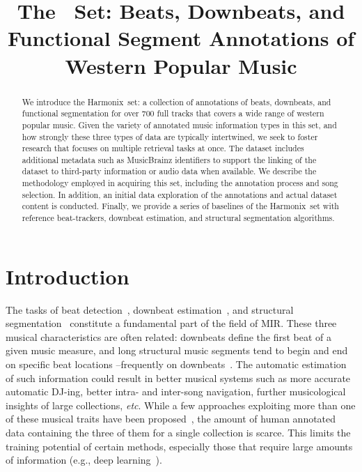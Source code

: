\documentclass{article}
\title{The \setNameUpper~Set: Beats, Downbeats, and Functional Segment Annotations of Western Popular Music}
\newcommand{\setName}{Harmonix}
\begin{document}
%
\maketitle
%
\begin{abstract}
    We introduce the \setName~set: a collection of annotations of beats, downbeats, and functional segmentation for over 700 full tracks that covers a wide range of western popular music.
    Given the variety of annotated music information types in this set, and how strongly these three types of data are typically intertwined, we seek to foster research that focuses on multiple retrieval tasks at once.
    The dataset includes additional metadata such as MusicBrainz identifiers to support the linking of the dataset to third-party information or audio data when available.
    We describe the methodology employed in acquiring this set, including the annotation process and song selection. 
    In addition, an initial data exploration of the annotations and actual dataset content is conducted. 
    Finally, we provide a series of baselines of the \setName~set with reference beat-trackers, downbeat estimation, and structural segmentation algorithms.
\end{abstract}
%
\section{Introduction}\label{sec:introduction}

The tasks of beat detection~\cite{Ellis2007}, downbeat estimation~\cite{Bock2016}, and structural segmentation~\cite{Paulus2010} constitute a fundamental part of the field of MIR.
These three musical characteristics are often related: downbeats define the first beat of a given music measure, and long structural music segments tend to begin and end on specific beat locations --frequently on downbeats~\cite{Foote1999}.
The automatic estimation of such information could result in better musical systems such as more accurate automatic DJ-ing, better intra- and inter-song navigation, further musicological insights of large collections, \emph{etc}.
While a few approaches exploiting more than one of these musical traits have been proposed~\cite{Bock2016, Mccallum2019, Fuentes2019}, the amount of human annotated data containing the three of them for a single collection is scarce.
This limits the training potential of certain methods, especially those that require large amounts of information (e.g., deep learning~\cite{Humphrey2012}).
\end{document}
